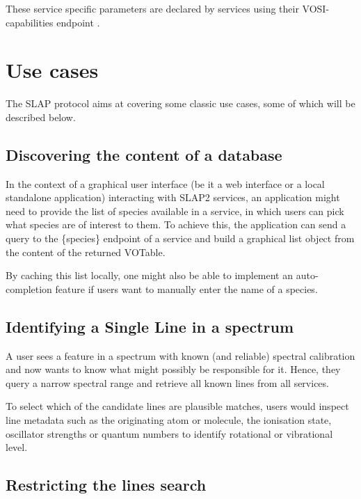\documentclass[11pt,a4paper]{ivoa}
\begin{document}
These service specific parameters are declared by services using their
VOSI-capabilities endpoint \citep{2017ivoa.spec.0524G}.

\section{Use cases}
\label{sect:use-cases}

The SLAP protocol aims at covering some classic use cases, some of which
will be described below.

\subsection{Discovering the content of a database}
\label{sect:content-discovery}

In the context of a graphical user interface (be it a web interface or a
local standalone application) interacting with SLAP2 services, an
application might need to provide the list of species available in a
service, in which users can pick what species are of interest to them.
To achieve
this, the application can send a query to the \{species\} endpoint of a
service and build a graphical list object from the content of the
returned VOTable.

By caching this list locally, one might also be able to implement an
auto-completion feature if users want to manually enter the name of
a species.

\subsection[Identifying a Single Line in a spectrum]{Identifying a Single Line in a spectrum}
\label{sect:line-id}

A user sees a feature in a spectrum with known (and reliable) spectral
calibration and now wants to know what might possibly be responsible for
it. Hence, they query a narrow spectral range and retrieve all known lines
from all services.

To select which of the candidate lines are plausible matches, users would
inspect line metadata such as the originating atom or molecule, the ionisation
state, oscillator strengths or quantum numbers to identify rotational or vibrational level.

\subsection{Restricting the lines search}
\label{sect:restricting-search}
\end{document}

